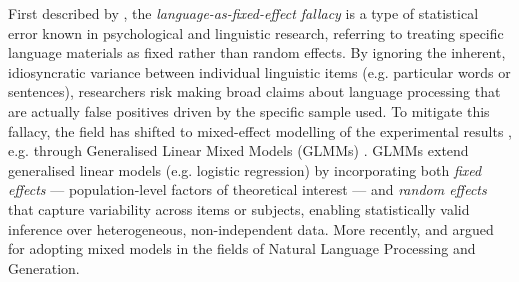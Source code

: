 \documentclass[11pt]{article}
\begin{document}
First described by \citet{clark1973language}, the \textit{language-as-fixed-effect fallacy} is a type of statistical error known in psychological and linguistic research, referring to treating specific language materials as fixed rather than random effects. By ignoring the inherent, idiosyncratic variance between individual linguistic items (e.g. particular words or sentences), researchers risk making broad claims about language processing that are actually false positives driven by the specific sample used.
To mitigate this fallacy, the field has shifted to mixed-effect modelling of the experimental results \citep{baayen2008mixed}, e.g. through Generalised Linear Mixed Models (GLMMs) \citep{jaeger2008categorical}. GLMMs extend generalised linear models (e.g. logistic regression) by incorporating both \textit{fixed effects} --- population-level factors of theoretical interest --- and \textit{random effects} that capture variability across items or subjects, enabling statistically valid inference over heterogeneous, non-independent data.
More recently, \citet{van2019best} and \citet{card2020little} argued for adopting mixed models in the fields of Natural Language Processing and Generation. 
\end{document}
